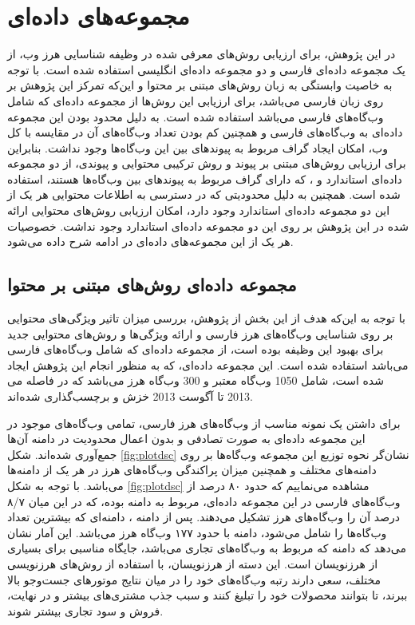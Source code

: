 \documentclass[twoside, a4paper,11pt]{book}
\numberwithin{equation}{chapter}
\numberwithin{table}{chapter}
\numberwithin{figure}{chapter}
\numberwithin{equation}{chapter}
\begin{document}
\section{مجموعه‌های داده‌ای}
\label{section:experiments-datasets}
در این پژوهش، برای ارزیابی روش‌های معرفی شده در وظیفه شناسایی هرز وب، از یک مجموعه‌ داده‌ای فارسی و دو مجموعه داده‌ای انگلیسی استفاده شده ‌است. با توجه به خاصیت وابستگی به زبان روش‌های مبتنی بر محتوا و این‌که تمرکز این پژوهش بر روی زبان فارسی می‌باشد، برای ارزیابی این روش‌ها از مجموعه ‌داده‌ای  که شامل وب‌گاه‌های فارسی می‌باشد استفاده شده ‌است. به دلیل محدود بودن این مجموعه داده‌ای به وب‌گاه‌های فارسی و همچنین کم بودن تعداد وب‌گاه‌های آن در مقایسه با کل وب، امکان ایجاد گراف مربوط به پیوندهای بین این وب‌گاه‌ها وجود نداشت. بنابراین برای ارزیابی روش‌های مبتنی بر پیوند و روش ترکیبی محتوایی و پیوندی، از دو مجموعه داده‌ای استاندارد  و ، که دارای گراف مربوط به پیوندهای بین وب‌گاه‌ها هستند، استفاده شده ‌است. همچنین به دلیل محدودیتی که در دسترسی به اطلاعات محتوایی هر یک از این دو مجموعه داده‌ای استاندارد وجود دارد، امکان ارزیابی روش‌های محتوایی ارائه شده در این پژوهش بر روی این دو مجموعه داده‌ای استاندارد وجود نداشت. خصوصیات هر یک از این مجموعه‌های داده‌ای در ادامه شرح داده می‌شود.

\subsection{مجموعه داده‌ای روش‌های مبتنی بر محتوا}
با توجه به این‌که هدف از این بخش از پژوهش، بررسی میزان تاثیر ویژگی‌های محتوایی بر روی شناسایی وب‌گاه‌های هرز فارسی و ارائه ویژگی‌‌ها و روش‌های محتوایی جدید برای بهبود این وظیفه بوده است، از مجموعه داده‌ای  که شامل وب‌گاه‌های فارسی می‌باشد استفاده شده است. این مجموعه داده‌ای، که به منظور انجام این پژوهش ایجاد شده است، شامل 1050 وب‌گاه معتبر و 300 وب‌گاه هرز می‌باشد که در فاصله می 2013 تا آگوست 2013 خزش و برچسب‌گذاری شده‌اند. 

برای داشتن یک نمونه مناسب از وب‌گاه‌های هرز فارسی، تمامی وب‌گاه‌های موجود در این مجموعه داده‌ای به صورت تصادفی و بدون اعمال محدودیت در دامنه آن‌ها جمع‌آوری شده‌اند. شکل \ref{fig:plotdsc} نشان‌گر نحوه توزیع این مجموعه وب‌گاه‌ها بر روی دامنه‌های مختلف و همچنین میزان پراکندگی وب‌گاه‌های هرز در هر یک از دامنه‌ها می‌باشد. با توجه به شکل \ref{fig:plotdsc} مشاهده می‌نماییم که حدود ۸۰ درصد از وب‌گاه‌های فارسی در این مجموعه داده‌ای، مربوط به دامنه  بوده، که در این میان ۸/۷ درصد آن را وب‌گاه‌های هرز تشکیل می‌دهند. پس از دامنه ، دامنه‌ای که بیشترین تعداد وب‌گاه‌ها را شامل می‌شود، دامنه  با حدود ۱۷۷ وب‌گاه‌ هرز می‌باشد. این آمار نشان می‌دهد که دامنه  که مربوط به وب‌گاه‌های تجاری می‌باشد، جایگاه مناسبی برای بسیاری از هرزنویسان است. این دسته از هرزنویسان، با استفاده از روش‌های هرزنویسی مختلف، سعی دارند رتبه وب‌گاه‌های خود را در میان نتایج موتورهای جست‌و‌جو بالا ببرند، تا بتوانند محصولات خود را تبلیغ کنند و سبب جذب مشتری‌های بیشتر و در نهایت، فروش و سود تجاری بیشتر شوند.
\end{document}

